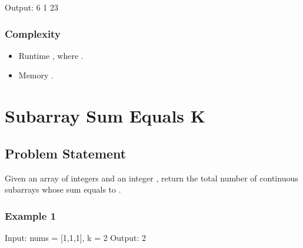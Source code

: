 \documentclass[letterpaper,12pt,english]{book}
\begin{document}
\begin{sphinxVerbatim}[commandchars=\\\{\}]
Output:
6
1
23
\end{sphinxVerbatim}


\subsubsection{Complexity}
\label{\detokenize{Prefix_Sum/53_Maximum_Subarray:complexity}}\begin{itemize}
\item {} 
\sphinxAtStartPar
Runtime , where .

\item {} 
\sphinxAtStartPar
Memory .

\end{itemize}

\sphinxstepscope


\section{Subarray Sum Equals K}
\label{\detokenize{Prefix_Sum/560_Subarray_Sum_Equals_K:subarray-sum-equals-k}}\label{\detokenize{Prefix_Sum/560_Subarray_Sum_Equals_K::doc}}

\subsection{Problem Statement\sphinxfootnotemark[105]}
\label{\detokenize{Prefix_Sum/560_Subarray_Sum_Equals_K:problem-statement}}%
\begin{footnotetext}[105]\sphinxAtStartFootnote
{}
%
\end{footnotetext}\ignorespaces 
\sphinxAtStartPar
Given an array of integers  and an integer , return the total number of continuous subarrays whose sum equals to .


\subsubsection{Example 1}
\label{\detokenize{Prefix_Sum/560_Subarray_Sum_Equals_K:example-1}}
\begin{sphinxVerbatim}[commandchars=\\\{\}]
Input: nums = [1,1,1], k = 2
Output: 2
\end{sphinxVerbatim}
\end{document}
